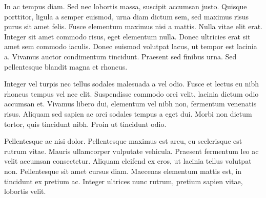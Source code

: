 \documentclass[12pt, a4paper, twocolumn]{article} %
\begin{document}
In ac tempus diam. Sed nec lobortis massa, suscipit accumsan justo. Quisque porttitor, ligula a semper euismod, urna diam dictum sem, sed maximus risus purus sit amet felis. Fusce elementum maximus nisi a mattis. Nulla vitae elit erat. Integer sit amet commodo risus, eget elementum nulla. Donec ultricies erat sit amet sem commodo iaculis. Donec euismod volutpat lacus, ut tempor est lacinia a. Vivamus auctor condimentum tincidunt. Praesent sed finibus urna. Sed pellentesque blandit magna et rhoncus.

Integer vel turpis nec tellus sodales malesuada a vel odio. Fusce et lectus eu nibh rhoncus tempus vel nec elit. Suspendisse commodo orci velit, lacinia dictum odio accumsan et. Vivamus libero dui, elementum vel nibh non, fermentum venenatis risus. Aliquam sed sapien ac orci sodales tempus a eget dui. Morbi non dictum tortor, quis tincidunt nibh. Proin ut tincidunt odio.

Pellentesque ac nisi dolor. Pellentesque maximus est arcu, eu scelerisque est rutrum vitae. Mauris ullamcorper vulputate vehicula. Praesent fermentum leo ac velit accumsan consectetur. Aliquam eleifend ex eros, ut lacinia tellus volutpat non. Pellentesque sit amet cursus diam. Maecenas elementum mattis est, in tincidunt ex pretium ac. Integer ultrices nunc rutrum, pretium sapien vitae, lobortis velit.


\printbibliography[title={Bibliography}] %

\end{document}
